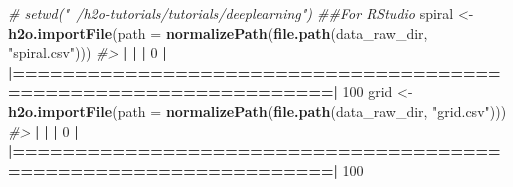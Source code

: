 \documentclass[]{book}
\newenvironment{Shaded}{\begin{snugshade}}{\end{snugshade}}
\newcommand{\CommentTok}[1]{\textcolor[rgb]{0.56,0.35,0.01}{\textit{#1}}}
\newcommand{\DataTypeTok}[1]{\textcolor[rgb]{0.13,0.29,0.53}{#1}}
\newcommand{\DecValTok}[1]{\textcolor[rgb]{0.00,0.00,0.81}{#1}}
\newcommand{\ErrorTok}[1]{\textcolor[rgb]{0.64,0.00,0.00}{\textbf{#1}}}
\newcommand{\KeywordTok}[1]{\textcolor[rgb]{0.13,0.29,0.53}{\textbf{#1}}}
\newcommand{\NormalTok}[1]{#1}
\newcommand{\OperatorTok}[1]{\textcolor[rgb]{0.81,0.36,0.00}{\textbf{#1}}}
\newcommand{\StringTok}[1]{\textcolor[rgb]{0.31,0.60,0.02}{#1}}
\begin{document}
\begin{Shaded}
\begin{Highlighting}[]
\CommentTok{# setwd("~/h2o-tutorials/tutorials/deeplearning") ##For RStudio}
\NormalTok{spiral <-}\StringTok{ }\KeywordTok{h2o.importFile}\NormalTok{(}\DataTypeTok{path =} \KeywordTok{normalizePath}\NormalTok{(}\KeywordTok{file.path}\NormalTok{(data_raw_dir, }\StringTok{"spiral.csv"}\NormalTok{)))}
\CommentTok{#> }
  \OperatorTok{|}\StringTok{                                                                       }
\StringTok{  }\ErrorTok{|}\StringTok{                                                                 }\ErrorTok{|}\StringTok{   }\DecValTok{0}\NormalTok{%}
  \OperatorTok{|}\StringTok{                                                                       }
\StringTok{  }\ErrorTok{|=================================================================|}\StringTok{ }\DecValTok{100}\NormalTok{%}
\NormalTok{grid   <-}\StringTok{ }\KeywordTok{h2o.importFile}\NormalTok{(}\DataTypeTok{path =} \KeywordTok{normalizePath}\NormalTok{(}\KeywordTok{file.path}\NormalTok{(data_raw_dir, }\StringTok{"grid.csv"}\NormalTok{)))}
\CommentTok{#> }
  \OperatorTok{|}\StringTok{                                                                       }
\StringTok{  }\ErrorTok{|}\StringTok{                                                                 }\ErrorTok{|}\StringTok{   }\DecValTok{0}\NormalTok{%}
  \OperatorTok{|}\StringTok{                                                                       }
\StringTok{  }\ErrorTok{|=================================================================|}\StringTok{ }\DecValTok{100}\NormalTok{%}

}}}}
\end{Highlighting}
\end{Shaded}
\end{document}
